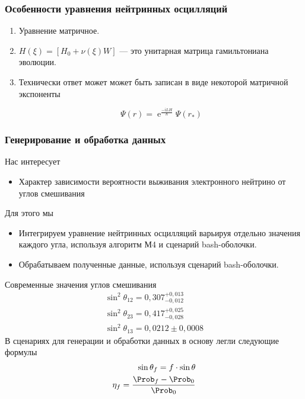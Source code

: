 \documentclass[utf8,9pt,mathserif,usepdftitle=false]{beamer}
\renewcommand{\exp}{\operatorname{e}}
\renewcommand{\imath}{\mathrm{i}}
\begin{document}
\begin{frame}
	\frametitle{Особенности уравнения нейтринных осцилляций}%
  \begin{enumerate}
  \item<1-> Уравнение матричное.
  \item<2-> \(H(\xi)=[H_{0}+\nu(\xi)W]\) — это унитарная матрица гамильтониана
    эволюции.
  \item<3-> Технически ответ может может быть записан в виде некоторой матричной
    экспоненты
    
    \begin{equation}
    	\Psi(r)=\exp^{\frac{-\imath LH}{\hbar}}\Psi(r_{*})
    \end{equation}
  \end{enumerate}
\end{frame}

\begin{frame}
	\frametitle{Генерирование и обработка данных}%
	Нас интересует
	\begin{itemize}
		\item<2-> Характер зависимости вероятности выживания электронного нейтрино от 
		углов смешивания
	\end{itemize}
	Для этого мы
	\begin{itemize}
		\item<4-> Интегрируем уравнение нейтринных осцилляций варьируя отдельно значения 
		каждого угла, используя алгоритм М4 и сценарий bash-оболочки.
		\item<5-> Обрабатываем полученные данные, используя сценарий bash-оболочки.
	\end{itemize}
	\onslide<6->%
	Современные значения углов смешивания
	\begin{align*}
		\sin^{2}{\theta_{12}}=0,307_{-0,012}^{+0,013}\\
		\sin^{2}{\theta_{23}}=0,417_{-0,028}^{+0,025}\\
		\sin^{2}{\theta_{13}}=0,0212\pm 0,0008
	\end{align*}
  В сценариях для генерации и обработки данных в основу легли следующие формулы
  \begin{align*}
  		\sin{\theta_{f}}=f\cdot\sin{\theta}\\
  		\eta_{f}=\frac{\Prob_{f}-\Prob_{0}}{\Prob_{0}}
  \end{align*}
  
\end{frame}
\end{document}
